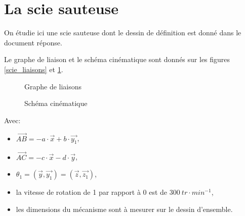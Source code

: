 



\newpage

\section{La scie sauteuse}

On étudie ici une scie sauteuse dont le dessin de définition est donné dans le document réponse.

Le graphe de liaison et le schéma cinématique sont donnés sur les figures \ref{scie_liaisons} et \ref{scie_cin}.

\begin{figure}[ht!]
\begin{minipage}{0.45\linewidth}
   \def\svgwidth{\linewidth}
   
\caption{\label{scie_liaisons}Graphe de liaisons}
\end{minipage}\hfill
\begin{minipage}{0.45\linewidth}
   \def\svgwidth{0.75\linewidth}
   
\caption{\label{scie_cin}Schéma cinématique}
\end{minipage}
\end{figure}

Avec:
\begin{itemize}
 \item $\overrightarrow{AB}=-a\cdot\vec{x}+b\cdot\vec{y_1}$,
 \item $\overrightarrow{AC}=-c\cdot\vec{x}-d\cdot\vec{y}$,
 \item $\theta_1=(\vec{y},\vec{y_1})=(\vec{z},\vec{z_1})$,
 \item la vitesse de rotation de 1 par rapport à 0 est de $300\ tr\cdot min^{-1}$,
 \item les dimensions du mécanisme sont à mesurer sur le dessin d'ensemble.
\end{itemize}



